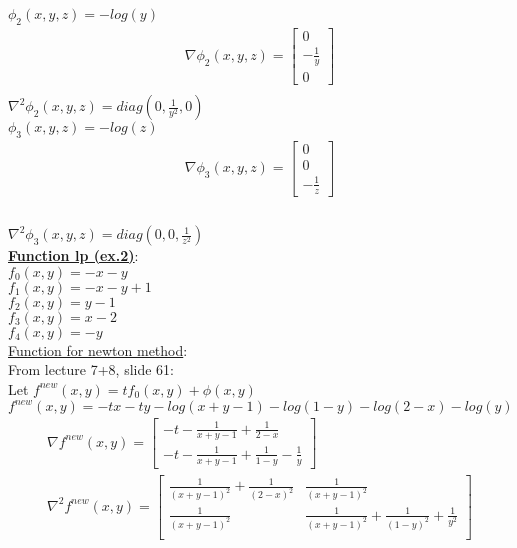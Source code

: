 \documentclass[fleqn]{article}
\begin{document}
$\phi_2(x,y,z) = -log(y)$ \\
\begin{multline*}
\nabla \phi_2(x,y,z) =
\begin{bmatrix} 0 \\ -\frac{1}{y} \\ 0 \end{bmatrix} \\
\end{multline*}
$\nabla^2 \phi_2(x,y,z) = diag(0,\frac{1}{y^2},0)$ \\


$\phi_3(x,y,z) = -log(z)$ \\
\begin{multline*}
\nabla \phi_3(x,y,z) =
\begin{bmatrix} 0 \\ 0 \\ -\frac{1}{z} \end{bmatrix} \\
\end{multline*} \\
$\nabla^2 \phi_3(x,y,z) = diag(0,0,\frac{1}{z^2})$ \\



\underline{\textbf{Function lp (ex.2)}}:\\
$f_0(x,y) = -x-y$ \\
$f_1(x,y) = -x-y+1 $ \\
$f_2(x,y) = y-1 $ \\
$f_3(x,y) = x-2 $ \\
$f_4(x,y) = -y $ \\

\underline{Function for newton method}:\\

From lecture 7+8, slide 61: \\
Let $f^{new}(x,y) = tf_0(x,y)+\phi(x,y)$\\

$f^{new}(x,y) = -tx-ty-log(x+y-1)-log(1-y)-log(2-x)-log(y)$\\ 

\begin{multline*}
\nabla f^{new}(x,y) =
\begin{bmatrix}
	-t -\frac{1}{x+y-1}+\frac{1}{2-x}             \\
	-t -\frac{1}{x+y-1}+\frac{1}{1-y} -\frac{1}{y}
\end{bmatrix} \\
\nabla^2 f^{new}(x,y) =
\begin{bmatrix} 
    \frac{1}{(x+y-1)^2} + \frac{1}{(2-x)^2} &
    \frac{1}{(x+y-1)^2}
 \\
	\frac{1}{(x+y-1)^2}                                 &
	\frac{1}{(x+y-1)^2}+\frac{1}{(1-y)^2}+\frac{1}{y^2}
 \\
\end{bmatrix} \\
\end{multline*} \\
\end{document}
